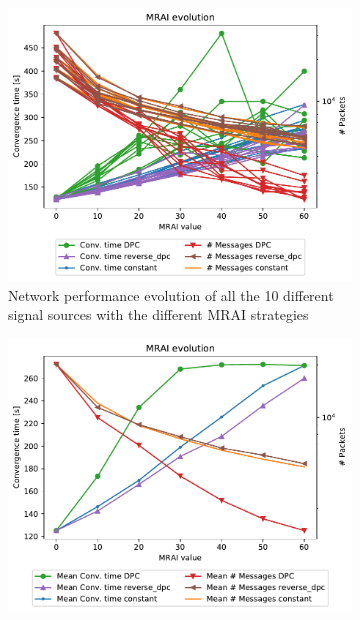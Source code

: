 \begin{figure}[h]
     \centering
     \begin{subfigure}[b]{0.49\textwidth}
         \centering
         \includegraphics[width=\textwidth]{images/position/different_destinations-1000_all.pdf}
		 \caption{Network performance evolution of all the \num{10} different signal sources
			with the different \ac{MRAI} strategies}
         \label{fig:different_destinations_all}
     \end{subfigure}
     \hfill
     \begin{subfigure}[b]{0.49\textwidth}
         \centering
         \includegraphics[width=\textwidth]{images/position/different_destinations-1000_mean.pdf}

\end{subfigure}
\end{figure}
